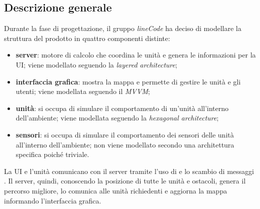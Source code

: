 \subsection{Descrizione generale}
Durante la fase di progettazione, il gruppo \textit{lineCode} ha deciso di modellare la struttura del prodotto in quattro componenti distinte:
\begin{itemize}
	\item \textbf{server}: motore di calcolo che coordina le unità e genera le informazioni per la UI; viene modellato seguendo la \textit{layered architecture};
	\item \textbf{interfaccia grafica}: mostra la mappa e permette di gestire le unità e gli utenti; viene modellata seguendo il \textit{MVVM};
	\item \textbf{unità}: si occupa di simulare il comportamento di un'unità all'interno dell'ambiente; viene modellata seguendo la \textit{hexagonal architecture};
	\item \textbf{sensori}: si occupa di simulare il comportamento dei sensori delle unità all'interno dell'ambiente; non viene modellato secondo una architettura specifica poiché triviale.
\end{itemize}
La UI e l'unità comunicano con il server tramite l'uso di  e lo scambio di messaggi . Il server, quindi, conoscendo la posizione di tutte le unità e ostacoli, genera il percorso migliore, lo comunica alle unità richiedenti e aggiorna la mappa informando l'interfaccia grafica.\\
